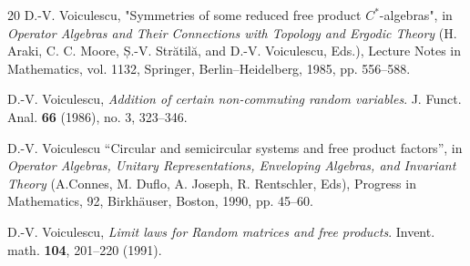 \documentclass[11pt]{article}
\begin{document}
\begin{thebibliography}{20}
D.-V. Voiculescu, "Symmetries of some reduced free product $C^*$-algebras", in \textit{Operator Algebras and Their Connections with Topology and Ergodic Theory} (H. Araki, C. C. Moore,  Ș.-V. Strătilă, and D.-V. Voiculescu, Eds.), Lecture Notes in Mathematics, vol. 1132, Springer, Berlin–Heidelberg, 1985, pp. 556--588.

D.-V. Voiculescu, \emph{Addition of certain non-commuting random variables}.
J. Funct. Anal. \textbf{66} (1986), no. 3, 323--346.

D.-V. Voiculescu
``Circular and semicircular systems and free product factors'',
in \textit{Operator Algebras, Unitary Representations, Enveloping Algebras, and Invariant Theory} (A.Connes, M. Duflo, A. Joseph, R. Rentschler, Eds), Progress in Mathematics, 92, Birkhäuser, Boston, 1990, 
pp. 45--60.

 D.-V. Voiculescu, \emph{Limit laws for Random matrices and free products}. Invent. math. \textbf{104}, 201--220 (1991).


\end{thebibliography}
\end{document}
